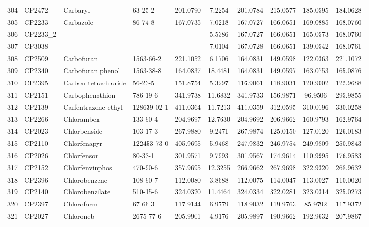 \begin{longtable}{clllcccccc}
304 & CP2472 & Carbaryl & 63-25-2 & 201.0790 & 7.2254 & 201.0784 & 215.0577 & 185.0595 & 184.0628 \\ 
305 & CP2233 & Carbazole & 86-74-8 & 167.0735 & 7.0218 & 167.0727 & 166.0651 & 169.0885 & 168.0760 \\ 
306 & CP2233\_2 & – & – & – & 5.5386 & 167.0727 & 166.0651 & 165.0573 & 168.0760 \\ 
307 & CP3038 & – & – & – & 7.0104 & 167.0728 & 166.0651 & 139.0542 & 168.0761 \\ 
308 & CP2509 & Carbofuran & 1563-66-2 & 221.1052 & 6.1706 & 164.0831 & 149.0598 & 122.0363 & 221.1072 \\ 
309 & CP2340 & Carbofuran phenol & 1563-38-8 & 164.0837 & 18.4481 & 164.0831 & 149.0597 & 163.0753 & 165.0876 \\ 
310 & CP2395 & Carbon tetrachloride & 56-23-5 & 151.8754 & 5.3297 & 116.9061 & 118.9031 & 120.9002 & 122.9688 \\ 
311 & CP2151 & Carbophenothion & 786-19-6 & 341.9738 & 11.6832 & 341.9733 & 156.9871 & 96.9506 & 295.9855 \\ 
312 & CP2139 & Carfentrazone ethyl & 128639-02-1 & 411.0364 & 11.7213 & 411.0359 & 312.0595 & 310.0196 & 330.0258 \\ 
313 & CP2266 & Chloramben & 133-90-4 & 204.9697 & 12.7630 & 204.9692 & 206.9662 & 160.9793 & 162.9764 \\ 
314 & CP2023 & Chlorbenside & 103-17-3 & 267.9880 & 9.2471 & 267.9874 & 125.0150 & 127.0120 & 126.0183 \\ 
315 & CP2110 & Chlorfenapyr & 122453-73-0 & 405.9695 & 5.9468 & 247.9832 & 246.9754 & 249.9809 & 250.9843 \\ 
316 & CP2026 & Chlorfenson & 80-33-1 & 301.9571 & 9.7993 & 301.9567 & 174.9614 & 110.9995 & 176.9583 \\ 
317 & CP2152 & Chlorfenvinphos & 470-90-6 & 357.9695 & 12.3255 & 266.9662 & 267.9698 & 322.9320 & 268.9632 \\ 
318 & CP2396 & Chlorobenzene & 108-90-7 & 112.0080 & 3.8688 & 112.0075 & 114.0047 & 113.0027 & 110.0020 \\ 
319 & CP2140 & Chlorobenzilate & 510-15-6 & 324.0320 & 11.4464 & 324.0334 & 322.0281 & 323.0314 & 325.0273 \\ 
320 & CP2397 & Chloroform\smash{\textsuperscript{\textdagger}} & 67-66-3 & 117.9144 & 6.9779 & 118.9032 & 119.9763 & 85.9792 & 117.9372 \\ 
321 & CP2027 & Chloroneb & 2675-77-6 & 205.9901 & 4.9176 & 205.9897 & 190.9662 & 192.9632 & 207.9867 \\ 

\end{longtable}
